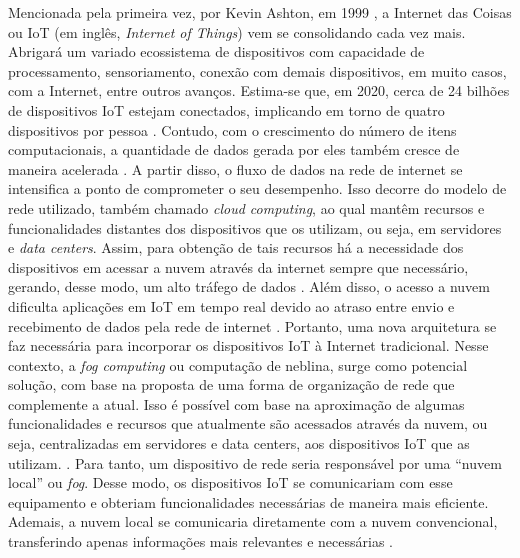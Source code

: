 Mencionada pela primeira vez, por Kevin Ashton, em 1999 \cite{Finep2015}, a Internet das Coisas ou IoT (em inglês, \textit{Internet of Things}) vem se consolidando cada vez mais. Abrigará um variado ecossistema de dispositivos com capacidade de processamento, sensoriamento, conexão com demais dispositivos, em muito casos, com a Internet, entre outros avanços. Estima-se que, em 2020, cerca de 24 bilhões de dispositivos IoT estejam conectados, implicando em torno de quatro dispositivos por pessoa \cite{Meola2016}.   
Contudo, com o crescimento do número de itens computacionais, a quantidade de dados gerada por eles também cresce de maneira acelerada \cite{Chiang2016}. A partir disso, o fluxo de dados na rede de internet se intensifica a ponto de comprometer o seu desempenho. Isso decorre do modelo de rede utilizado, também chamado \textit{cloud computing}, ao qual mantêm recursos e funcionalidades distantes dos dispositivos que os utilizam, ou seja, em servidores e \textit{data centers}. Assim, para obtenção de tais recursos há a necessidade dos dispositivos em acessar a nuvem através da internet sempre que necessário, gerando, desse modo, um alto tráfego de dados \cite{Vaquero2014}. 
Além disso, o acesso a nuvem dificulta aplicações em IoT em tempo real devido ao atraso entre envio e recebimento de dados pela rede de internet \cite{Syed2016}.
Portanto, uma nova arquitetura se faz necessária para incorporar os dispositivos IoT à Internet tradicional. 
Nesse contexto, a \textit{fog computing} ou computação de neblina, surge como potencial solução, com base na proposta de uma forma de organização de rede que complemente a atual. Isso é possível com base na aproximação de algumas funcionalidades e recursos que atualmente são acessados através da nuvem, ou seja, centralizadas em servidores e data centers, aos dispositivos IoT que as utilizam.
\cite{Chiang2016}. Para tanto, um dispositivo de rede seria responsável por uma ``nuvem local'' ou \textit{fog}. Desse modo, os dispositivos IoT se comunicariam com esse equipamento e obteriam funcionalidades necessárias de maneira mais eficiente. Ademais, a nuvem local se comunicaria diretamente com a nuvem convencional, transferindo apenas informações mais relevantes e necessárias \cite{Syed2016}.

